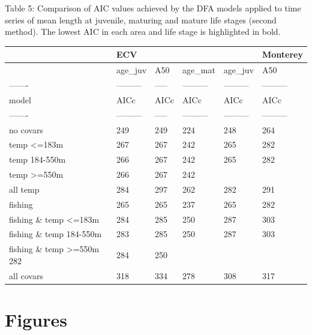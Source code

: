 \documentclass[
]{article}
\begin{document}
Table 5: Comparison of AIC values achieved by the DFA models applied to
time series of mean length at juvenile, maturing and mature life stages
(second method). The lowest AIC in each area and life stage is
highlighted in bold.

\begin{longtable}[]{@{}llllll@{}}
\toprule()
& ECV & & & & Monterey \\
\midrule()
\endhead
& age\_juv & A50 & age\_mat & age\_juv & A50 \\
------- & --------- & ----- & --------- & --------- & --------- \\
model & AICc & AICc & AICc & AICc & AICc \\
------- & --------- & ----- & --------- & --------- & --------- \\
no covars & 249 & 249 & 224 & 248 & 264 \\
temp \textless=183m & 267 & 267 & 242 & 265 & 282 \\
temp 184-550m & 266 & 267 & 242 & 265 & 282 \\
temp \textgreater=550m & 266 & 267 & 242 & & \\
all temp & 284 & 297 & 262 & 282 & 291 \\
fishing & 265 & 265 & 237 & 265 & 282 \\
fishing \& temp \textless=183m & 284 & 285 & 250 & 287 & 303 \\
fishing \& temp 184-550m & 283 & 285 & 250 & 287 & 303 \\
fishing \& temp \textgreater=550m 282 & 284 & 250 & & & \\
all covars & 318 & 334 & 278 & 308 & 317 \\
\bottomrule()
\end{longtable}

\hypertarget{figures}{%
\section{Figures}\label{figures}}
\end{document}
